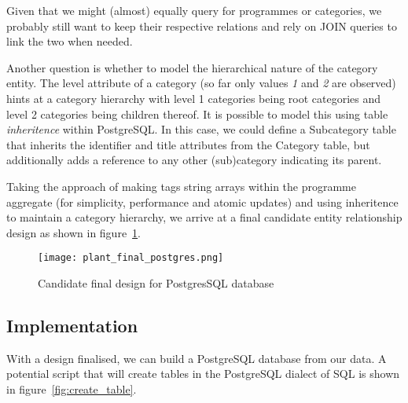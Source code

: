 \documentclass[11pt,a4paper]{article}
\begin{document}
Given that we might (almost) equally query for programmes or categories,
we probably still want to keep their respective relations and rely on
JOIN queries to link the two when needed.

Another question is whether to model the hierarchical nature of the
category entity. The level attribute of a category (so far only values
\emph{1} and \emph{2} are observed) hints at a category hierarchy with
level 1 categories being root categories and level 2 categories being
children thereof. It is possible to model this using table
\emph{inheritence} within PostgreSQL. In this case, we could define
a Subcategory table that inherits the identifier and title attributes
from the Category table, but additionally adds a reference to any
other (sub)category indicating its parent.

Taking the approach of making tags string arrays within the programme
aggregate (for simplicity, performance and atomic updates) and using
inheritence to maintain a category hierarchy, we arrive at a final
candidate entity relationship design as shown in figure~\ref{fig:final_postgres}.

\begin{comment}
  @startuml plant_final_postgres.png
  class Programme {
    pid : varchar
    complete_title : varchar
    media_type : enum ['video, 'audio']
    masterbrand : varchar
    brand_pid : varchar
    is_clip : boolean
    tags : varchar[]
  }
  class AvailabilityWindow {
    start_time : timestamp
    end_time : timestamp
    service : varchar
  }
  class Category {
    id : varchar
    title : varchar
  }
  class Subcategory extends Category {
    parent : Category
  }
  Programme "1" -d- "0..*" AvailabilityWindow
  Programme "0..*" -r- "0..*" Category
  @enduml
\end{comment}
\begin{figure}[p]
  \begin{center}
    \texttt{[image: plant\_final\_postgres.png]}
  \end{center}
  \caption{Candidate final design for PostgresSQL database}
  \label{fig:final_postgres}
\end{figure}

\subsection{Implementation}

With a design finalised, we can build a PostgreSQL database from
our data. A potential script that will create tables in the PostgreSQL
dialect of SQL is shown in figure~\ref{fig:create_table}.
\end{document}

